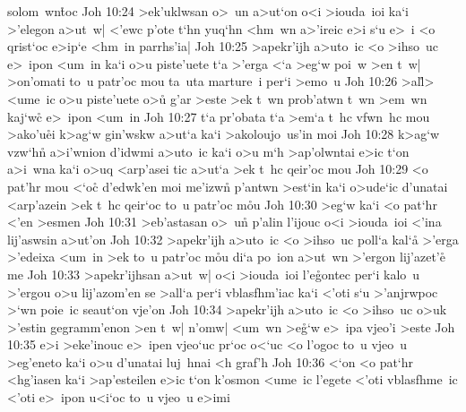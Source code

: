 solom~wn\r{t}oc\bibvsend
{}
\vs Joh 10:24
>ek'uklwsan
o>~un
a>ut`on
o<i
>iouda~ioi
ka`i
>'elegon
a>ut~w|
<'ewc
p'ote
t`hn
yuq`hn
<hm~wn
a>'ireic
e>i
s`u
e>~i
<o
qrist`oc
e>ip`e
<hm~in
parrhs'ia|\bibvsend
\vs Joh 10:25
>apekr'ijh
a>uto~ic
<o
>ihso~uc
e>~ipon
<um~in
ka`i
o>u
piste'uete
t`a
>'erga
<`a
>eg`w
poi~w
>en
t~w|
>on'omati
to~u
patr'oc
mou
ta~uta
marture~i
per`i
>emo~u\bibvsend
\vs Joh 10:26
>al\r{l}>
<ume~ic
o>u
piste'uete
o>u\r{}
g'ar
>este
>ek
t~wn
prob'atwn
t~wn
>em~wn
kaj`wc\r{}
e>~ipon
<um~in\bibvsend
\vs Joh 10:27
t`a
pr'obata
t`a
>em`a
t~hc
vfwn~hc
mou
>ako'u\r{e}i
k>ag`w
gin'wskw
a>ut`a
ka`i
>akoloujo~us'in
moi\bibvsend
\vs Joh 10:28
k>ag`w
vzw`hn\r{}
a>i'wnion
d'idwmi
a>uto~ic
ka`i
o>u
m`h
>ap'olwntai
e>ic
t`on
a>i~wna
ka`i
o>uq
<arp'asei
tic
a>ut`a
>ek
t~hc
qeir'oc
mou\bibvsend
\vs Joh 10:29
<o
pat'hr
mou
<`o\r{c}
d'edwk'en
moi
me'izwn\r{}
p'antwn
>est`in
ka`i
o>ude`ic
d'unatai
<arp'azein
>ek
t~hc
qeir`oc
to~u
patr'oc
m\r{o}u\bibvsend
{}
\vs Joh 10:30
>eg`w
ka`i
<o
pat`hr
<'en
>esmen\bibvsend
\vs Joh 10:31
>eb'astasan
o>~u\r{n}
p'alin
l'ijouc
o<i
>iouda~ioi
<'ina
lij'aswsin
a>ut'on\bibvsend
\vs Joh 10:32
>apekr'ijh
a>uto~ic
<o
>ihso~uc
poll`a
kal`a\r{}
>'erga
>'edeixa
<um~in
>ek
to~u
patr'oc
m\r{o}u
di`a
po~ion
a>ut~wn
>'ergon
lij'azet'e\r{}
me\bibvsend
\vs Joh 10:33
>apekr'ijhsan
a>ut~w|
o<i
>iouda~ioi
l'e\r{g}ontec
per`i
kalo~u
>'ergou
o>u
lij'azom'en
se
>all`a
per`i
vblasfhm'iac
ka`i
<'oti
s`u
>'anjrwpoc
>`wn
poie~ic
seaut`on
vje'on\bibvsend
\vs Joh 10:34
>apekr'ijh
a>uto~ic
<o
>ihso~uc
o>uk
>'estin
gegramm'enon
>en
t~w|
n'omw|
<um~wn
>e\r{g}`w
e>~ipa
vjeo'i
>este\bibvsend
\vs Joh 10:35
e>i
>eke'inouc
e>~ipen
vjeo`uc
pr`oc
o<`uc
<o
l'ogoc
to~u
vjeo~u
>eg'eneto
ka`i
o>u
d'unatai
luj~hnai
<h
graf'h\bibvsend
\vs Joh 10:36
<`on
<o
pat`hr
<hg'iasen
ka`i
>ap'esteilen
e>ic
t`on
k'osmon
<ume~ic
l'egete
<'oti
vblasfhme~ic
<'oti
e>~ipon
u<i`oc
to~u
vjeo~u
e>imi\bibvsend
